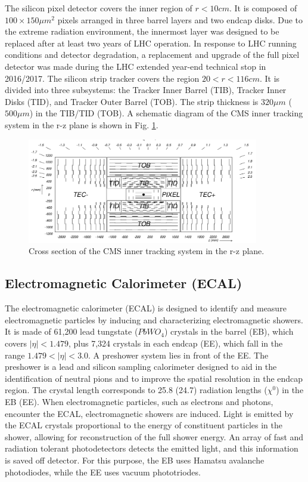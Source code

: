 The silicon pixel detector covers the inner region of $r < 10 cm$. It is composed of $100 \times 150 \mu m^{2}$ pixels arranged in three barrel layers and two endcap disks. Due to the extreme 
radiation environment, the innermost layer was designed to be replaced after at least two years of LHC operation. 
In response to LHC running conditions and detector degradation, a replacement and upgrade of the full pixel detector was made during the LHC extended year-end technical stop in 2016/2017. 
The silicon strip tracker covers the region $20 < r < 116 cm$. It is divided into three subsystems: the Tracker Inner Barrel (TIB), Tracker Inner Disks (TID), and Tracker Outer Barrel (TOB). 
The strip thickness is $320 \mu m$ ($500 \mu m$) in the TIB/TID (TOB). A schematic diagram of the CMS inner tracking system in the r-z plane is shown in Fig. \ref{fig:cms_tracker}.

\begin{figure}
  \centering
   \includegraphics[width=0.9\textwidth]{fig/experiment/detector/cms_tracker.png}
	\caption{Cross section of the CMS inner tracking system in the r-z plane.}
	\label{fig:cms_tracker}
\end{figure}


\subsection{Electromagnetic Calorimeter (ECAL)}
The electromagnetic calorimeter (ECAL) is designed to identify and measure electromagnetic particles by inducing and characterizing electromagnetic showers. 
It is made of 61,200 lead tungstate ($PbWO_4$) crystals in the barrel (EB), which covers $|\eta| < 1.479$, plus 7,324 crystals in each endcap (EE), which fall in the range $1.479 < |\eta| < 3.0$. A preshower system lies in front of the EE. The preshower is a lead and silicon sampling calorimeter designed to aid in the identification of neutral pions and to improve the spatial resolution in the 
endcap region. 
The crystal length corresponds to 25.8 (24.7) radiation lengths ($\chi^{0}$) in the EB (EE). When electromagnetic particles, such as 
electrons and photons, encounter the ECAL, electromagnetic showers are induced. Light is emitted by the ECAL crystals proportional to the energy of constituent particles in the shower, allowing 
for reconstruction of the full shower energy. An array of fast and radiation tolerant photodetectors detects the emitted light, and this information is saved off detector. 
For this purpose, the EB uses Hamatsu avalanche photodiodes, while the EE uses vacuum phototriodes. 



